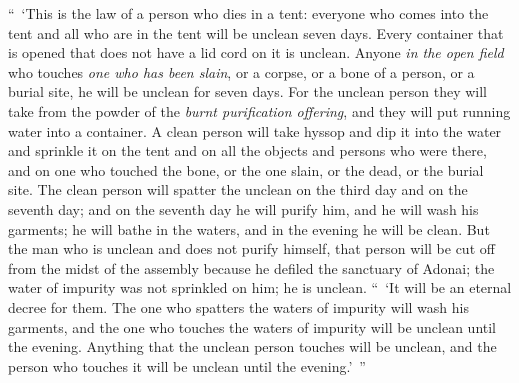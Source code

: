 \begin{biblechapter}
\verse “ ‘This is the law of a person who dies in a tent: everyone who comes into the tent and all who are in the tent will be unclean seven days.
\verse Every container that is opened that does not have a lid cord on it is unclean.
\verse Anyone \textit{in the open field} who touches \textit{one who has been slain}, or a corpse, or a bone of a person, or a burial site, he will be unclean for seven days.
\verse For the unclean person they will take from the powder of the \textit{burnt purification offering}, and they will put running water into a container.
\verse A clean person will take hyssop and dip it into the water and sprinkle it on the tent and on all the objects and persons who were there, and on one who touched the bone, or the one slain, or the dead, or the burial site.
\verse The clean person will spatter the unclean on the third day and on the seventh day; and on the seventh day he will purify him, and he will wash his garments; he will bathe in the waters, and in the evening he will be clean.
\verse But the man who is unclean and does not purify himself, that person will be cut off from the midst of the assembly because he defiled the sanctuary of Adonai; the water of impurity was not sprinkled on him; he is unclean.
\verse “ ‘It will be an eternal decree for them. The one who spatters the waters of impurity will wash his garments, and the one who touches the waters of impurity will be unclean until the evening.
\verse Anything that the unclean person touches will be unclean, and the person who touches it will be unclean until the evening.’ ”
\end{biblechapter}

